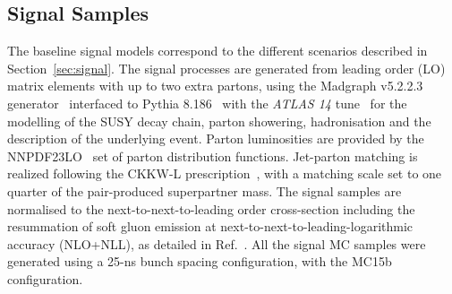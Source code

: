 \subsection{Signal Samples}
\label{sec:SigSamples}

\begin{table}[!t]
\begin{center}
\end{center}
\caption{List of simulated samples for SUSY signal model grids. 
The range of dataset IDs, the typical number of generated events $N_{gen}$ per sample 
and the typical generator filter efficiency are shown.}
\label{tab:SigSamples}
\end{table}

The baseline signal models correspond to the different scenarios described in Section~\ref{sec:signal}. 
The signal processes are generated from leading order (LO) matrix elements with up to two extra partons, using the {\sc Madgraph v5.2.2.3} generator~\cite{madgraph} 
interfaced to {\sc Pythia} 8.186~\cite{Sjostrand:2007gs} with the \textit{ATLAS 14} tune~\cite{pub-2014-021} 
for the modelling of the SUSY decay chain, parton showering, hadronisation and the description of the underlying event. 
Parton luminosities are provided by the {\sc NNPDF23LO}~\cite{Carrazza:2013axa} set of parton distribution functions. 
Jet-parton matching is realized following the CKKW-L prescription~\cite{Lonnblad:2011xx}, with a matching scale set to one quarter of the pair-produced superpartner mass. 
The signal samples are normalised to the next-to-next-to-leading order cross-section 
including the resummation of soft gluon emission at next-to-next-to-leading-logarithmic accuracy (NLO+NLL), as detailed in Ref.~\cite{Borschensky:2014cia}. 
All the signal MC samples were generated using a 25-ns bunch spacing configuration, with the MC15b configuration. 

